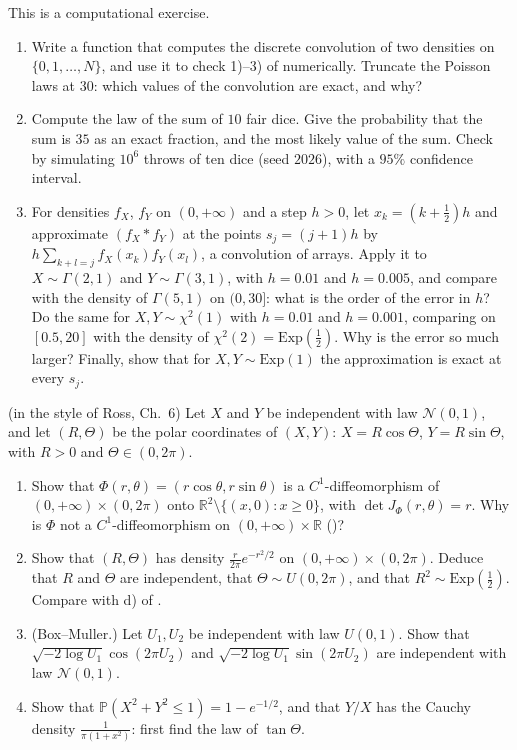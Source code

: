 \begin{exercise}\label{ex:rv-convolution}
\medium This is a computational exercise.
\begin{enumerate}[label=(\alph*)]
  \item Write a function that computes the discrete convolution of two densities on
    $\{0,1,\dots,N\}$, and use it to check 1)--3) of  numerically.
    Truncate the Poisson laws at $30$: which values of the convolution are exact, and why?
  \item Compute the law of the sum of $10$ fair dice. Give the probability that the sum is $35$ as an
    exact fraction, and the most likely value of the sum. Check by simulating $10^6$ throws of ten dice
    (seed $2026$), with a $95\%$ confidence interval.
  \item For densities $f_X$, $f_Y$ on $(0,+\infty)$ and a step $h>0$, let
    $x_k=(k+\frac12)h$ and approximate $(f_X*f_Y)$ at the points $s_j=(j+1)h$ by
    $h\sum_{k+l=j}f_X(x_k)f_Y(x_l)$, a convolution of arrays. Apply it to $X\sim\Gamma(2,1)$ and
    $Y\sim\Gamma(3,1)$, with $h=0.01$ and $h=0.005$, and compare with the density of $\Gamma(5,1)$ on
    $(0,30]$: what is the order of the error in $h$? Do the same for $X,Y\sim\chi^2(1)$ with $h=0.01$
    and $h=0.001$, comparing on $[0.5,20]$ with the density of $\chi^2(2)=\mathrm{Exp}(\frac12)$. Why is
    the error so much larger? Finally, show that for $X,Y\sim\mathrm{Exp}(1)$ the approximation is exact
    at every $s_j$.
\end{enumerate}
\end{exercise}

\begin{exercise}\label{ex:rv-polar}
\hard (in the style of Ross, Ch.~6) Let $X$ and $Y$ be independent with law $\mathcal N(0,1)$, and let
$(R,\Theta)$ be the polar coordinates of $(X,Y)$: $X=R\cos\Theta$, $Y=R\sin\Theta$, with $R>0$ and
$\Theta\in(0,2\pi)$.
\begin{enumerate}[label=(\alph*)]
  \item Show that $\Phi(r,\theta)=(r\cos\theta,r\sin\theta)$ is a $C^1$-diffeomorphism of
    $(0,+\infty)\times(0,2\pi)$ onto $\mathbb R^2\setminus\{(x,0):x\ge0\}$, with
    $\det J_\Phi(r,\theta)=r$. Why is $\Phi$ not a $C^1$-diffeomorphism on $(0,+\infty)\times\mathbb R$
    ()?
  \item Show that $(R,\Theta)$ has density $\frac r{2\pi}e^{-r^2/2}$ on $(0,+\infty)\times(0,2\pi)$.
    Deduce that $R$ and $\Theta$ are independent, that $\Theta\sim U(0,2\pi)$, and that
    $R^2\sim\mathrm{Exp}(\frac12)$. Compare with d) of .
  \item (Box--Muller.) Let $U_1,U_2$ be independent with law $U(0,1)$. Show that
    $\sqrt{-2\log U_1}\cos(2\pi U_2)$ and $\sqrt{-2\log U_1}\sin(2\pi U_2)$ are independent with law
    $\mathcal N(0,1)$.
  \item Show that $\mathbb P(X^2+Y^2\le1)=1-e^{-1/2}$, and that $Y/X$ has the Cauchy density
    $\frac1{\pi(1+x^2)}$: first find the law of $\tan\Theta$.
\end{enumerate}
\end{exercise}

